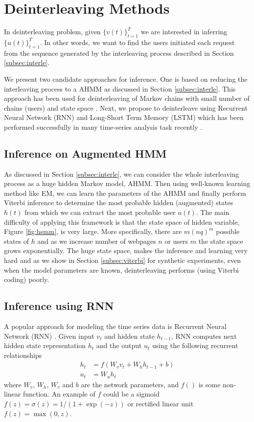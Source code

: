 \documentclass[conference]{IEEEtran}
\begin{document}
	\section{Deinterleaving Methods}
	In deinterleaving problem, given $\{v(t)\}_{t=1}^T$ we are interested in inferring $\{u(t)\}_{t=1}^T$.
	In other words, we want to find the users initiated each request from the sequence generated by the interleaving process described in Section \ref{subsec:interle}. 
	
	We present two candidate approaches for inference. 
	One is based on reducing the interleaving process to a AHMM as discussed in Section \ref{subsec:interle}. 
	This approach has been used for deinterleaving of Markov chains with small number of chains (users) and state space \cite{minot2014separation}. 
	Next, we propose to deinterleave using Recurrent Neural Network (RNN) and Long-Short Term Memory (LSTM) which has been performed successfully in many time-series analysis task recently \cite{chung2014empirical,Hochreiter}. 
	
	\subsection{Inference on Augmented HMM}
	As discussed in Section \ref{subsec:interle}, we can consider the whole interleaving process as a huge hidden Markov model, AHMM. 
	Then using well-known learning method like EM, we can learn the parameters of the AHMM and finally perform Viterbi inference to determine the most probable hidden (augmented) states $h(t)$ from which we can extract the most probable user $u(t)$. 
	The main difficulty of applying this framework is that the state space of hidden variable, Figure \ref{fig:hsmm}, is very large.
	More specifically, there are $m (nq)^m$ possible states of $h$ and as we increase number of webpages $n$ or users $m$ the state space grows exponentially. 
	The huge state space, makes the inference and learning very hard and as we show in Section \ref{subsec:viterbi} for synthetic experiments, even when the model parameters are known, deinterleaving performs (using Viterbi coding) poorly. 
	
	\subsection{Inference using RNN}
	A popular approach for modeling the time series data is Recurrent Neural Network (RNN) \cite{lecun2015deep}. Given input $v_t$ and hidden state $h_{t-1}$, RNN computes next hidden state representation $h_t$ and the output $u_t$ using the following recurrent relationships
	\begin{align}
	\label{eq:rnn}
	h_{t} &= f(W_v v_{t} + W_h h_{t - 1} + b)\\
	u_t &= W_u h_t
	\end{align}
	where $W_v$, $W_h$, $W_v$ and $b$ are the network parameters, and $f()$ is some non-linear function. An example of $f$ could be a sigmoid $f(z) = \sigma(z) = 1/(1+\exp(-z))$ or rectified linear unit $f(z) = \max(0,z)$. 
	
\end{document}
